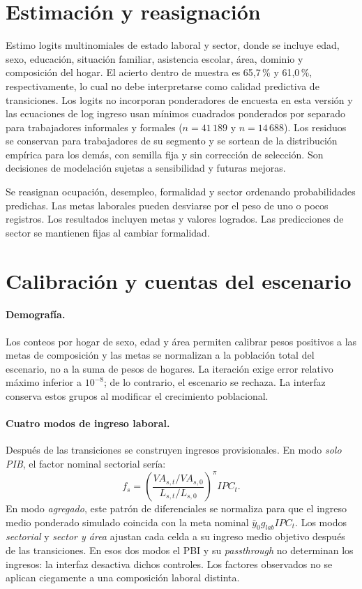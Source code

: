 \documentclass[11pt,a4paper]{article}
\begin{document}
\section{Estimación y reasignación}
Estimo logits multinomiales de estado laboral y sector, donde se incluye edad, sexo, educación, situación familiar, asistencia escolar, área, dominio y composición del hogar. El acierto dentro de muestra es 65,7\,\% y 61,0\,\%, respectivamente, lo cual no debe interpretarse como calidad predictiva de transiciones. Los logits no incorporan ponderadores de encuesta en esta versión y las ecuaciones de log ingreso usan mínimos cuadrados ponderados por separado para trabajadores informales y formales (\(n=41\,189\) y \(n=14\,688\)). Los residuos se conservan para trabajadores de su segmento y se sortean de la distribución empírica para los demás, con semilla fija y sin corrección de selección. Son decisiones de modelación sujetas a sensibilidad y futuras mejoras.

Se reasignan ocupación, desempleo, formalidad y sector ordenando probabilidades predichas. Las metas laborales pueden desviarse por el peso de uno o pocos registros. Los resultados incluyen metas y valores logrados. Las predicciones de sector se mantienen fijas al cambiar formalidad.

\section{Calibración y cuentas del escenario}
\paragraph{Demografía.} Los conteos por hogar de sexo, edad y área permiten calibrar pesos positivos a las metas de composición y las metas se normalizan a la población total del escenario, no a la suma de pesos de hogares. La iteración exige error relativo máximo inferior a \(10^{-8}\); de lo contrario, el escenario se rechaza. La interfaz conserva estos grupos al modificar el crecimiento poblacional.

\paragraph{Cuatro modos de ingreso laboral.} Después de las transiciones se construyen ingresos provisionales. En modo \emph{solo PIB}, el factor nominal sectorial sería:
\[
f_s=\left(\frac{VA_{s,t}/VA_{s,0}}{L_{s,t}/L_{s,0}}\right)^{\pi} IPC_t.
\]
En modo \emph{agregado}, este patrón de diferenciales se normaliza para que el ingreso medio ponderado simulado coincida con la meta nominal \(\bar y_0 g_{lab}IPC_t\). Los modos \emph{sectorial} y \emph{sector y área} ajustan cada celda a su ingreso medio objetivo después de las transiciones. En esos dos modos el PBI y su \emph{passthrough} no determinan los ingresos: la interfaz desactiva dichos controles. Los factores observados no se aplican ciegamente a una composición laboral distinta.
\end{document}
